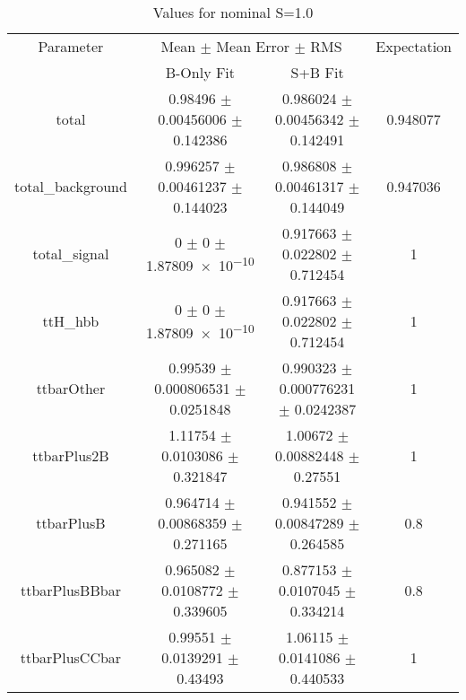 \begin{table}
\centering
\caption{Values for nominal S=1.0}
\begin{tabular}{cccc}
\toprule
Parameter & \multicolumn{2}{c}{Mean $\pm$ Mean Error $\pm$ RMS} & Expectation\\
 & B-Only Fit & S+B Fit & \\
\midrule
total & \num{0.98496} $\pm$ \num{0.00456006} $\pm$ \num{0.142386} & \num{0.986024} $\pm$ \num{0.00456342} $\pm$ \num{0.142491} & \num{0.948077}\\
total\_background & \num{0.996257} $\pm$ \num{0.00461237} $\pm$ \num{0.144023} & \num{0.986808} $\pm$ \num{0.00461317} $\pm$ \num{0.144049} & \num{0.947036}\\
total\_signal & \num{0} $\pm$ \num{0} $\pm$ \num{1.87809e-10} & \num{0.917663} $\pm$ \num{0.022802} $\pm$ \num{0.712454} & \num{1}\\
ttH\_hbb & \num{0} $\pm$ \num{0} $\pm$ \num{1.87809e-10} & \num{0.917663} $\pm$ \num{0.022802} $\pm$ \num{0.712454} & \num{1}\\
ttbarOther & \num{0.99539} $\pm$ \num{0.000806531} $\pm$ \num{0.0251848} & \num{0.990323} $\pm$ \num{0.000776231} $\pm$ \num{0.0242387} & \num{1}\\
ttbarPlus2B & \num{1.11754} $\pm$ \num{0.0103086} $\pm$ \num{0.321847} & \num{1.00672} $\pm$ \num{0.00882448} $\pm$ \num{0.27551} & \num{1}\\
ttbarPlusB & \num{0.964714} $\pm$ \num{0.00868359} $\pm$ \num{0.271165} & \num{0.941552} $\pm$ \num{0.00847289} $\pm$ \num{0.264585} & \num{0.8}\\
ttbarPlusBBbar & \num{0.965082} $\pm$ \num{0.0108772} $\pm$ \num{0.339605} & \num{0.877153} $\pm$ \num{0.0107045} $\pm$ \num{0.334214} & \num{0.8}\\
ttbarPlusCCbar & \num{0.99551} $\pm$ \num{0.0139291} $\pm$ \num{0.43493} & \num{1.06115} $\pm$ \num{0.0141086} $\pm$ \num{0.440533} & \num{1}\\
\bottomrule
\end{tabular}
\end{table}